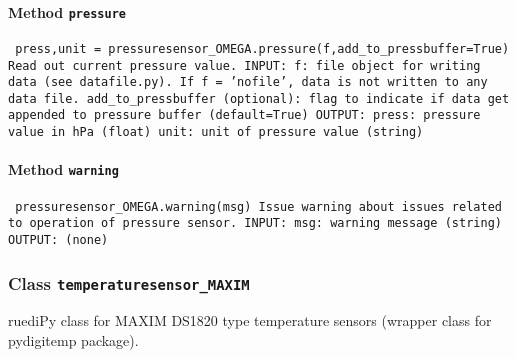 \paragraph{Method \texttt{pressure}}
\vspace{1ex}
\texttt{\newline
press,unit = pressuresensor_OMEGA.pressure(f,add_to_pressbuffer=True)\newline
\newline
Read out current pressure value.\newline
\newline
INPUT:\newline
f: file object for writing data (see datafile.py). If f = 'nofile', data is not written to any data file.\newline
add_to_pressbuffer (optional): flag to indicate if data get appended to pressure buffer (default=True)\newline
\newline
OUTPUT:\newline
press: pressure value in hPa (float)\newline
unit: unit of pressure value (string)\newline
\newline
}

\paragraph{Method \texttt{warning}}
\vspace{1ex}
\texttt{\newline
pressuresensor_OMEGA.warning(msg)\newline
\newline
Issue warning about issues related to operation of pressure sensor.\newline
\newline
INPUT:\newline
msg: warning message (string)\newline
\newline
OUTPUT:\newline
(none)\newline
\newline
}

\subsubsection{Class \texttt{temperaturesensor_MAXIM}}
\par
ruediPy class for MAXIM DS1820 type temperature sensors (wrapper class for pydigitemp package).\par

